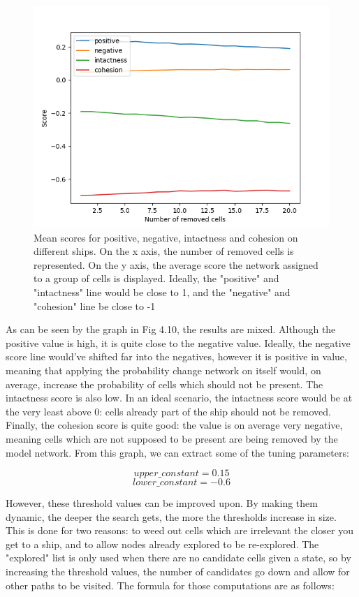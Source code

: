 \documentclass{l4proj}
\begin{document}
\begin{figure}[h!]
\centering
\includegraphics[width=0.8\linewidth]{dissertation/images/graphs/n_removed_cells_score_probability_analysis.png}
\caption{Mean scores for positive, negative, intactness and cohesion on different ships. On the x axis, the number of removed cells is represented. On the y axis, the average score the network assigned to a group of cells is displayed. Ideally, the "positive" and "intactness" line would be close to 1, and the "negative" and "cohesion" line be close to -1}
\label{fig:subim1}
\end{figure}

As can be seen by the graph in Fig 4.10, the results are mixed. Although the positive value is high, it is quite close to the negative value. Ideally, the negative score line would've shifted far into the negatives, however it is positive in value, meaning that applying the probability change network on itself would, on average, increase the probability of cells which should not be present. The intactness score is also low. In an ideal scenario, the intactness score would be at the very least above 0: cells already part of the ship should not be removed. Finally, the cohesion score is quite good: the value is on average very negative, meaning cells which are not supposed to be present are being removed by the model network. From this graph, we can extract some of the tuning parameters:

\[ upper\_constant = 0.15 \]
\[ lower\_constant = -0.6 \]

However, these threshold values can be improved upon. By making them dynamic, the deeper the search gets, the more the thresholds increase in size. This is done for two reasons: to weed out cells which are irrelevant the closer you get to a ship, and to allow nodes already explored to be re-explored. The "explored" list is only used when there are no candidate cells given a state, so by increasing the threshold values, the number of candidates go down and allow for other paths to be visited. The formula for those computations are as follows:
\end{document}
